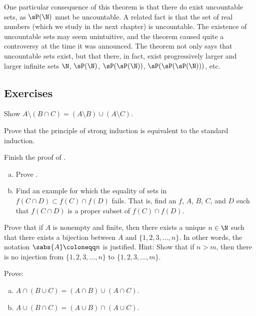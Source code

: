 One particular consequence of this 
theorem is that there do exist uncountable sets,
as $\sP(\N)$ must be uncountable.
A related fact is that
the set of real numbers (which we study in the next chapter) is uncountable.
The existence of uncountable sets may seem unintuitive, and the theorem
caused quite a controversy at the time
it was announced.  The theorem not only says that uncountable sets exist,
but that there, in fact, exist progressively larger
and larger infinite sets $\N$, $\sP(\N)$,
$\sP(\sP(\N))$, $\sP(\sP(\sP(\N)))$, etc.

\subsection{Exercises}

\begin{exercise}
Show
$A \setminus (B \cap C) = (A \setminus B) \cup (A \setminus C)$.
\end{exercise}

\begin{exercise}
Prove that the principle of strong induction is equivalent to the standard
induction.
\end{exercise}

\begin{exercise}
Finish the proof of .
\end{exercise}

\begin{exercise}
\leavevmode
\begin{enumerate}[a)]
\item
Prove .
\item
Find an example for which the equality of sets
in 
$f( C \cap D) \subset f (C) \cap f (D)$
fails.  That is, find an $f$, $A$, $B$, $C$, and $D$ such that
$f( C \cap D)$ is a proper subset of $f(C) \cap f(D)$.
\end{enumerate}
\end{exercise}

\begin{exercise}[Tricky]
Prove that if $A$ is nonempty and finite, then there exists a unique
$n \in \N$ such
that there exists a bijection between $A$ and $\{ 1, 2, 3, \ldots, n \}$.
In other words, the notation $\sabs{A} \coloneqq n$ is justified.
Hint: Show that if $n > m$, then there is no injection from
$\{ 1, 2, 3, \ldots, n \}$ to
$\{ 1, 2, 3, \ldots, m \}$.
\end{exercise}


\begin{exercise}
Prove:
\begin{enumerate}[a)]
\item $A \cap (B \cup C) = (A \cap B) \cup (A \cap C)$.
\item $A \cup (B \cap C) = (A \cup B) \cap (A \cup C)$.
\end{enumerate}
\end{exercise}

